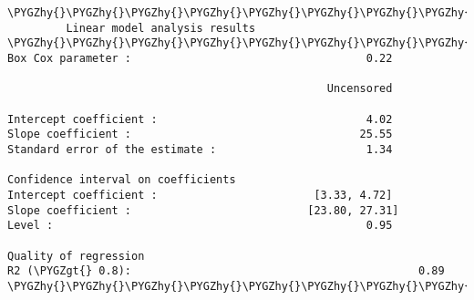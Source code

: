 \documentclass[letterpaper,10pt,english]{sphinxmanual}
\def\PYGZgt{\char`\>}
\def\PYGZhy{\char`\-}
\begin{document}
\begin{Verbatim}[commandchars=\\\{\}]
\PYGZhy{}\PYGZhy{}\PYGZhy{}\PYGZhy{}\PYGZhy{}\PYGZhy{}\PYGZhy{}\PYGZhy{}\PYGZhy{}\PYGZhy{}\PYGZhy{}\PYGZhy{}\PYGZhy{}\PYGZhy{}\PYGZhy{}\PYGZhy{}\PYGZhy{}\PYGZhy{}\PYGZhy{}\PYGZhy{}\PYGZhy{}\PYGZhy{}\PYGZhy{}\PYGZhy{}\PYGZhy{}\PYGZhy{}\PYGZhy{}\PYGZhy{}\PYGZhy{}\PYGZhy{}\PYGZhy{}\PYGZhy{}\PYGZhy{}\PYGZhy{}\PYGZhy{}\PYGZhy{}\PYGZhy{}\PYGZhy{}\PYGZhy{}\PYGZhy{}\PYGZhy{}\PYGZhy{}\PYGZhy{}\PYGZhy{}\PYGZhy{}\PYGZhy{}\PYGZhy{}\PYGZhy{}\PYGZhy{}\PYGZhy{}\PYGZhy{}\PYGZhy{}\PYGZhy{}\PYGZhy{}\PYGZhy{}\PYGZhy{}\PYGZhy{}\PYGZhy{}\PYGZhy{}\PYGZhy{}\PYGZhy{}\PYGZhy{}\PYGZhy{}\PYGZhy{}\PYGZhy{}\PYGZhy{}\PYGZhy{}\PYGZhy{}\PYGZhy{}\PYGZhy{}\PYGZhy{}\PYGZhy{}\PYGZhy{}\PYGZhy{}\PYGZhy{}\PYGZhy{}\PYGZhy{}\PYGZhy{}\PYGZhy{}\PYGZhy{}
         Linear model analysis results
\PYGZhy{}\PYGZhy{}\PYGZhy{}\PYGZhy{}\PYGZhy{}\PYGZhy{}\PYGZhy{}\PYGZhy{}\PYGZhy{}\PYGZhy{}\PYGZhy{}\PYGZhy{}\PYGZhy{}\PYGZhy{}\PYGZhy{}\PYGZhy{}\PYGZhy{}\PYGZhy{}\PYGZhy{}\PYGZhy{}\PYGZhy{}\PYGZhy{}\PYGZhy{}\PYGZhy{}\PYGZhy{}\PYGZhy{}\PYGZhy{}\PYGZhy{}\PYGZhy{}\PYGZhy{}\PYGZhy{}\PYGZhy{}\PYGZhy{}\PYGZhy{}\PYGZhy{}\PYGZhy{}\PYGZhy{}\PYGZhy{}\PYGZhy{}\PYGZhy{}\PYGZhy{}\PYGZhy{}\PYGZhy{}\PYGZhy{}\PYGZhy{}\PYGZhy{}\PYGZhy{}\PYGZhy{}\PYGZhy{}\PYGZhy{}\PYGZhy{}\PYGZhy{}\PYGZhy{}\PYGZhy{}\PYGZhy{}\PYGZhy{}\PYGZhy{}\PYGZhy{}\PYGZhy{}\PYGZhy{}\PYGZhy{}\PYGZhy{}\PYGZhy{}\PYGZhy{}\PYGZhy{}\PYGZhy{}\PYGZhy{}\PYGZhy{}\PYGZhy{}\PYGZhy{}\PYGZhy{}\PYGZhy{}\PYGZhy{}\PYGZhy{}\PYGZhy{}\PYGZhy{}\PYGZhy{}\PYGZhy{}\PYGZhy{}\PYGZhy{}
Box Cox parameter :                                    0.22

                                                 Uncensored

Intercept coefficient :                                4.02
Slope coefficient :                                   25.55
Standard error of the estimate :                       1.34

Confidence interval on coefficients
Intercept coefficient :                        [3.33, 4.72]
Slope coefficient :                           [23.80, 27.31]
Level :                                                0.95

Quality of regression
R2 (\PYGZgt{} 0.8):                                            0.89
\PYGZhy{}\PYGZhy{}\PYGZhy{}\PYGZhy{}\PYGZhy{}\PYGZhy{}\PYGZhy{}\PYGZhy{}\PYGZhy{}\PYGZhy{}\PYGZhy{}\PYGZhy{}\PYGZhy{}\PYGZhy{}\PYGZhy{}\PYGZhy{}\PYGZhy{}\PYGZhy{}\PYGZhy{}\PYGZhy{}\PYGZhy{}\PYGZhy{}\PYGZhy{}\PYGZhy{}\PYGZhy{}\PYGZhy{}\PYGZhy{}\PYGZhy{}\PYGZhy{}\PYGZhy{}\PYGZhy{}\PYGZhy{}\PYGZhy{}\PYGZhy{}\PYGZhy{}\PYGZhy{}\PYGZhy{}\PYGZhy{}\PYGZhy{}\PYGZhy{}\PYGZhy{}\PYGZhy{}\PYGZhy{}\PYGZhy{}\PYGZhy{}\PYGZhy{}\PYGZhy{}\PYGZhy{}\PYGZhy{}\PYGZhy{}\PYGZhy{}\PYGZhy{}\PYGZhy{}\PYGZhy{}\PYGZhy{}\PYGZhy{}\PYGZhy{}\PYGZhy{}\PYGZhy{}\PYGZhy{}\PYGZhy{}\PYGZhy{}\PYGZhy{}\PYGZhy{}\PYGZhy{}\PYGZhy{}\PYGZhy{}\PYGZhy{}\PYGZhy{}\PYGZhy{}\PYGZhy{}\PYGZhy{}\PYGZhy{}\PYGZhy{}\PYGZhy{}\PYGZhy{}\PYGZhy{}\PYGZhy{}\PYGZhy{}\PYGZhy{}


\end{Verbatim}
\end{document}
